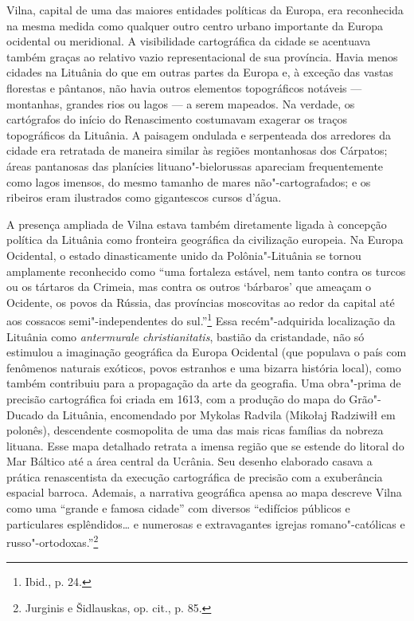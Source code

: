 Vilna, capital de uma das maiores entidades políticas da Europa, era
reconhecida na mesma medida como qualquer outro centro urbano importante
da Europa ocidental ou meridional. A visibilidade cartográfica da cidade
se acentuava também graças ao relativo vazio representacional de sua
província. Havia menos cidades na Lituânia do que em outras partes da
Europa e, à exceção das vastas florestas e pântanos, não havia outros
elementos topográficos notáveis --- montanhas, grandes rios ou lagos --- a
serem mapeados. Na verdade, os cartógrafos do início do Renascimento
costumavam exagerar os traços topográficos da Lituânia. A paisagem
ondulada e serpenteada dos arredores da cidade era retratada de maneira
similar às regiões montanhosas dos Cárpatos; áreas pantanosas das
planícies lituano"-bielorussas apareciam frequentemente como lagos
imensos, do mesmo tamanho de mares não"-cartografados; e os ribeiros eram
ilustrados como gigantescos cursos d'água.

A presença ampliada de Vilna estava também diretamente ligada à
concepção política da Lituânia como fronteira geográfica da civilização
europeia. Na Europa Ocidental, o estado dinasticamente unido da
Polônia"-Lituânia se tornou amplamente reconhecido como ``uma fortaleza
estável, nem tanto contra os turcos ou os tártaros da Crimeia, mas
contra os outros `bárbaros' que ameaçam o Ocidente, os povos da Rússia,
das províncias moscovitas ao redor da capital até aos cossacos
semi"-independentes do sul.''\footnote{Ibid., p. 24.} Essa
recém"-adquirida localização da Lituânia como \textit{antermurale
christianitatis}, bastião da cristandade, não só estimulou a imaginação
geográfica da Europa Ocidental (que populava o país com fenômenos
naturais exóticos, povos estranhos e uma bizarra história local), como
também contribuiu para a propagação da arte da geografia. Uma obra"-prima
de precisão cartográfica foi criada em 1613, com a produção do mapa do
Grão"-Ducado da Lituânia, encomendado por Mykolas Radvila (Mikołaj
Radziwiłł em polonês), descendente cosmopolita de uma das mais ricas
famílias da nobreza lituana. Esse mapa detalhado retrata a imensa região
que se estende do litoral do Mar Báltico até a área central da Ucrânia.
Seu desenho elaborado casava a prática renascentista da execução
cartográfica de precisão com a exuberância espacial barroca. Ademais, a
narrativa geográfica apensa ao mapa descreve Vilna como uma ``grande e
famosa cidade'' com diversos ``edifícios públicos e particulares
esplêndidos\ldots{} e numerosas e extravagantes igrejas romano"-católicas
e russo"-ortodoxas.''\footnote{Jurginis e Šidlauskas, op. cit., p. 85.}

